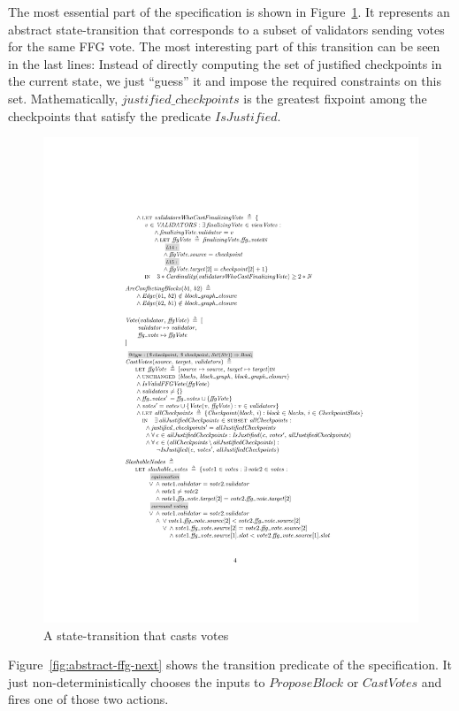 The most essential part of the specification is shown in
Figure~\ref{fig:abstract-ffg-cast-votes}. It represents an abstract
state-transition that corresponds to a subset of validators sending votes for
the same FFG vote. The most interesting part of this transition can be seen in
the last lines: Instead of directly computing the set of justified checkpoints
in the current state, we just ``guess'' it and impose the required constraints
on this set. Mathematically, $\textit{justified\_checkpoints}$ is the greatest
fixpoint among the checkpoints that satisfy the predicate
$\textit{IsJustified}$.


\begin{figure}
    \centering
    \includegraphics[width=\textwidth]{images/abstract-ffg-cast-votes.pdf}  %
    \caption{A state-transition that casts votes}\label{fig:abstract-ffg-cast-votes}
\end{figure}

Figure~\ref{fig:abstract-ffg-next} shows the transition predicate of the
specification. It just non-deterministically chooses the inputs to
$\textit{ProposeBlock}$ or $\textit{CastVotes}$ and fires one of those two
actions.

